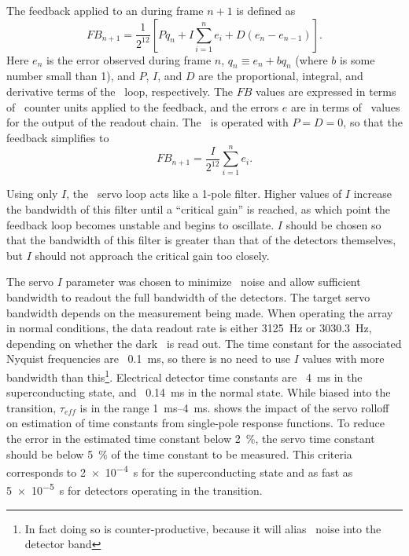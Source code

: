 The feedback applied to an  during frame $n+1$ is defined as \cite{mce_team_data_2013}
\begin{equation}
  FB_{n+1} = \frac{1}{2^{12}} \left[P q_n + I \sum_{i=1}^n e_i + D (e_n - e_{n-1}) \right].
\end{equation}
Here $e_n$ is the error observed during frame $n$, $q_n \equiv e_n + b q_n$ (where $b$ is some number small than 1), and $P$, $I$, and $D$ are the proportional, integral, and derivative terms of the \PID\ loop, respectively.
The $FB$ values are expressed in terms of \DAC\ counter units applied to the  feedback, and the errors $e$ are in terms of \ADC\ values for the output of the readout chain.
The \Imager\ is operated with $P = D = 0$, so that the feedback simplifies to
\begin{equation} \label{eqn:mce-pid-i-only}
  FB_{n+1} = \frac{I}{2^{12}} \sum_{i=1}^n e_i.
\end{equation}

Using only $I$, the \MCE\ servo loop acts like a 1-pole filter.
Higher values of $I$ increase the bandwidth of this filter until a ``critical gain'' is reached, as which point the feedback loop becomes unstable and begins to oscillate.
$I$ should be chosen so that the bandwidth of this filter is greater than that of the detectors themselves, but $I$ should not approach the critical gain too closely.

The servo $I$ parameter was chosen to minimize \SQUID\ noise and allow sufficient bandwidth to readout the full bandwidth of the detectors.
The target servo bandwidth depends on the measurement being made.
When operating the array in normal conditions, the data readout rate is either \SI{3125}{Hz} or \SI{3030.3}{Hz}, depending on whether the dark \SQUID\ is read out.
The time constant for the associated Nyquist frequencies are \abt~\SI{0.1}{ms}, so there is no need to use $I$ values with more bandwidth than this\footnote{In fact doing so is counter-productive, because it will alias \SQUID\ noise into the detector band}.
Electrical detector time constants are \abt~\SI{4}{ms} in the superconducting state, and \abt~\SI{0.14}{ms} in the normal state.
While biased into the transition, $\tau_{eff}$ is in the range \SIrange{1}{4}{ms}.
 shows the impact of the servo rolloff on estimation of time constants from single-pole response functions.
To reduce the error in the estimated time constant below \SI{2}{\percent}, the servo time constant should be below \SI{5}{\percent} of the time constant to be measured.
This criteria corresponds to \SI{2e-4}{s} for the superconducting state and as fast as \SI{5e-5}{s} for detectors operating in the transition.

